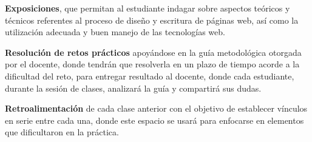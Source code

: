 \textbf{Exposiciones}, que permitan al estudiante indagar sobre aspectos teóricos y técnicos referentes al proceso de diseño y escritura de páginas web, así como la utilización adecuada y buen manejo de las tecnologías web.

\textbf{Resolución de retos prácticos} apoyándose en la guía metodológica otorgada por el docente, donde tendrán que resolverla en un plazo de tiempo acorde a la dificultad del reto, para entregar resultado al docente, donde cada estudiante, durante la sesión de clases, analizará la guía y compartirá sus dudas.

\textbf{Retroalimentación} de cada clase anterior con el objetivo de establecer vínculos en serie entre cada una, donde este espacio se usará para enfocarse en elementos que dificultaron en la práctica.

\pagebreak